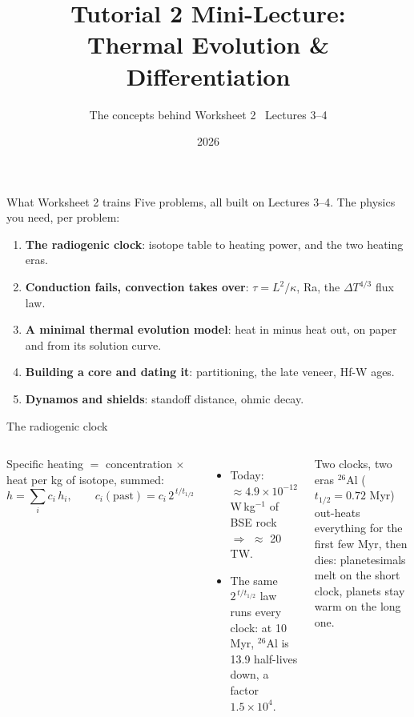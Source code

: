 \documentclass[aspectratio=169, 11pt]{beamer}
\title[T2 mini-lecture: Heat \& Differentiation]{Tutorial 2 Mini-Lecture:\\Thermal Evolution \& Differentiation}
\subtitle{The concepts behind Worksheet 2 \textbullet\ Lectures 3--4}
\author{}
\institute{Kapteyn Astronomical Institute\\University of Groningen}
\date{2026}
\begin{document}
\begin{frame}
  \titlepage
\end{frame}

\begin{frame}{What Worksheet 2 trains}
  Five problems, all built on Lectures 3--4. The physics you need, per problem:
  \vskip6pt\relax
  \begin{enumerate}
    \item \textbf{The radiogenic clock}: isotope table to heating power, and the two heating eras.
    \item \textbf{Conduction fails, convection takes over}: $\tau = L^2/\kappa$, Ra, the $\Delta T^{4/3}$ flux law.
    \item \textbf{A minimal thermal evolution model}: heat in minus heat out, on paper and from its solution curve.
    \item \textbf{Building a core and dating it}: partitioning, the late veneer, Hf-W ages.
    \item \textbf{Dynamos and shields}: standoff distance, ohmic decay.
  \end{enumerate}
  \vskip6pt\relax
\end{frame}

\begin{frame}{The radiogenic clock}
  \small
  \begin{columns}[T]
    Specific heating $=$ concentration $\times$ heat per kg of isotope, summed:
    \[
      h = \sum_i c_i\,h_i,
      \qquad
      \boxed{c_i(\text{past}) = c_i\,2^{\,t/t_{1/2}}}
    \]
    \begin{itemize}
      \item Today: $\approx 4.9 \times 10^{-12}$ W\,kg$^{-1}$ of BSE rock $\Rightarrow$ $\approx$ 20 TW.
      \item The same $2^{\,t/t_{1/2}}$ law runs every clock: at 10 Myr, ${}^{26}$Al is 13.9 half-lives down, a factor $1.5 \times 10^{4}$.
    \end{itemize}

    \begin{block}{Two clocks, two eras}
      ${}^{26}$Al ($t_{1/2} = 0.72$ Myr) out-heats everything for the first few Myr, then dies: planetesimals melt on the short clock, planets stay warm on the long one.
    \end{block}
  \end{columns}
\end{frame}
\end{document}
